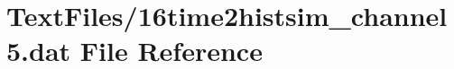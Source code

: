 \hypertarget{16time2histsim__channel5_8dat}{}\section{Text\+Files/16time2histsim\+\_\+channel5.dat File Reference}
\label{16time2histsim__channel5_8dat}
